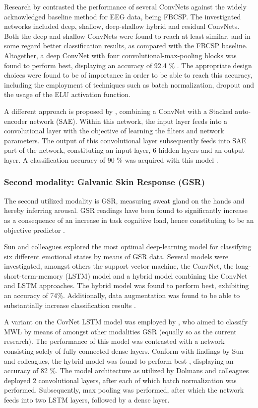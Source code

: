 \documentclass[12pt]{article}
\begin{document}
Research by  contrasted the performance of several ConvNets against the widely acknowledged baseline method for EEG data, being FBCSP. The investigated networks included deep, shallow, deep-shallow hybrid and residual ConvNets. Both the deep and shallow ConvNets were found to reach at least similar, and in some regard better classification results, as compared with the FBCSP baseline. Altogether, a deep ConvNet with four convolutional-max-pooling blocks was found to perform best, displaying an accuracy of 92.4 \% \cite{schirrmeister2017deep}. The appropriate design choices were found to be of importance in order to be able to reach this accuracy, including the employment of techniques such as batch normalization, dropout and the usage of the ELU activation function.

A different approach is proposed by , combining a ConvNet with a Stacked auto-encoder network (SAE). Within this network, the input layer feeds into a convolutional layer with the objective of learning the filters and network parameters. The output of this convolutional layer subsequently feeds into SAE part of the network, constituting an input layer, 6 hidden layers and an output layer. A classification accuracy of 90 \% was acquired with this model \cite{tabar2016novel} . 

\subsubsection{Second modality: Galvanic Skin Response (GSR)}
The second utilized modality is GSR, measuring sweat gland on the hands and hereby inferring arousal. GSR readings have been found to significantly increase as a consequence of an increase in task cognitive load, hence constituting to be an objective predictor \cite{shi2007galvanic}. 

Sun and colleagues explored the most optimal deep-learning model for classifying six different emotional states by means of GSR data. Several models were investigated, amongst others the support vector machine, the ConvNet, the long-short-term-memory (LSTM) model and a hybrid model combining the ConvNet and LSTM approaches. The hybrid model was found to perform best, exhibiting an accuracy of 74\%. Additionally, data augmentation was found to be able to substantially increase classification results \cite{sun2019hybrid}. 

A variant on the CovNet LSTM model was employed by , who aimed to classify MWL by means of amongst other modalities GSR (equally so as the current research). The performance of this model was contrasted with a network consisting solely of fully connected dense layers. Conform with findings by Sun and colleagues, the hybrid model was found to perform best \cite{dolmans2020perceived}, displaying an accuracy of 82 \%. The model architecture as utilized by Dolmans and colleagues deployed 2 convolutional layers, after each of which batch normalization was performed. Subsequently, max pooling was performed, after which the network feeds into two LSTM layers, followed by a dense layer.
\end{document}
